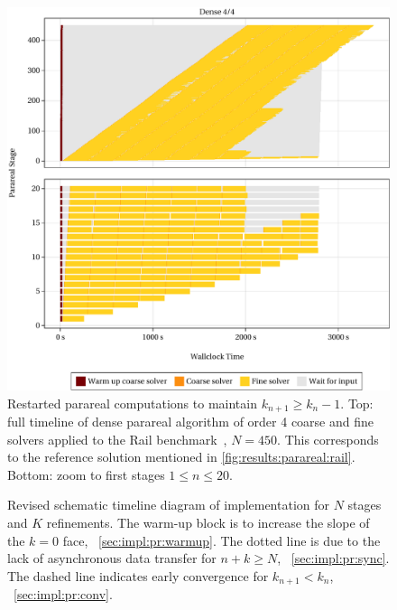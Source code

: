 \begin{figure}[tp]
  \centering
  \includegraphics[width=\textwidth]{figures/fig_timeline_ref.pdf}
  \caption[Restarted parareal computations]{
    Restarted parareal computations to maintain $k_{n+1} \geq k_n - 1$.
    Top: full timeline of dense parareal algorithm of order 4 coarse and fine solvers applied to the Rail benchmark~\cite{morwiki_steel}, $N=450$.
    This corresponds to the reference solution mentioned in \autoref{fig:results:parareal:rail}.
    Bottom: zoom to first stages $1 \leq n \leq 20$.
  }
  \label{fig:impl:restart}
\end{figure}

\begin{figure}[t]
  \centering
  
  \caption[Revised schematic timeline diagram]{%
    Revised schematic timeline diagram of  implementation for $N$ stages and $K$ refinements.
    The warm-up block is to increase the slope of the $k=0$ face,
    \cf~\autoref{sec:impl:pr:warmup}.
    The dotted line is due to the lack of asynchronous data transfer for $n+k \geq N$,
    \cf~\autoref{sec:impl:pr:sync}.
    The dashed line indicates early convergence for $k_{n+1} < k_n$,
    \cf~\autoref{sec:impl:pr:conv}.
  }
  \label{fig:timeline:revised}
\end{figure}

